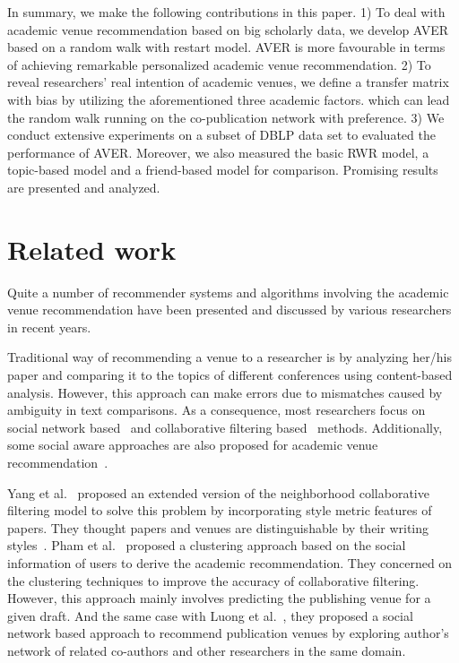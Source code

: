 \documentclass[9pt]{acm_proc_article-sp}
\begin{document}
In summary, we make the following contributions in this paper. 1) To deal with academic venue recommendation based on big scholarly data, we develop AVER based on a random walk with restart model. AVER is more favourable in terms of achieving remarkable personalized academic venue recommendation. 2) To reveal researchers' real intention of academic venues, we define a transfer matrix with bias by utilizing the aforementioned three academic factors. which can lead the random walk running on the co-publication network with preference. 3) We conduct extensive experiments on a subset of DBLP data set to evaluated the performance of AVER. Moreover, we also measured the basic RWR model, a topic-based model and a friend-based model for comparison. Promising results are presented and analyzed.

\section{Related work}
Quite a number of recommender systems and algorithms involving the academic venue recommendation have been presented and discussed by various researchers in recent years.

Traditional way of recommending a venue to a researcher is by analyzing her/his paper and comparing it to the topics of different conferences using content-based analysis. However, this approach can make errors due to mismatches caused by ambiguity in text comparisons. As a consequence, most researchers focus on social network based~\cite{luong2012publication,chen2012social} and collaborative filtering based~\cite{pham2011clustering,yang2012venue} methods. Additionally, some social aware approaches are also proposed for academic venue recommendation~\cite{asabere2014improving,xia2013socially,hornick2012extending}.

Yang et al.~\cite{yang2012venue} proposed an extended version of the neighborhood collaborative filtering model to solve this problem by incorporating style metric features of papers. They thought papers and venues are distinguishable by their writing styles~\cite{yang2012distinguishing}. Pham et al.~\cite{pham2011clustering} proposed a clustering approach based on the social information of users to derive the academic recommendation. They concerned on the clustering techniques to improve the accuracy of collaborative filtering. However, this approach mainly involves predicting the publishing venue for a given draft. And the same case with Luong et al.~\cite{luong2012publication}, they proposed a social network based approach to recommend publication venues by exploring author's network of related co-authors and other researchers in the same domain.
\end{document}
